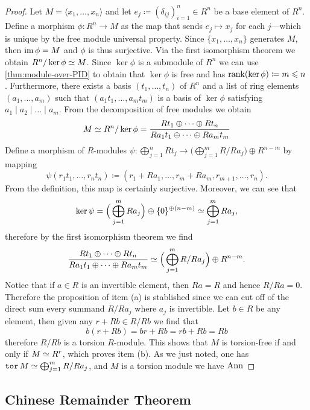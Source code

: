 \begin{proof}
Let \(M = \langle x_1, \dots, x_n \rangle\) and let
\(e_j \coloneq (\delta_{ij})_{i=1}^n \in R^n\) be a base element of \(R^n\). Define a morphism
\(\phi: R^n \to M\) as the map that sends \(e_j \mapsto x_j\) for each
\(j\)---which is unique by the free module universal property. Since
\(\{x_1, \dots, x_n\}\) generates \(M\), then \(\operatorname{im} \phi = M\) and \(\phi\) is thus
surjective. Via the first isomorphism theorem we obtain
\(R^n/\ker \phi \simeq M\). Since \(\ker \phi\) is a submodule of \(R^n\) we can use
\cref{thm:module-over-PID} to obtain that \(\ker \phi\) is free and has
\(\operatorname{rank}(\ker \phi) \coloneq m \leqslant n\). Furthermore, there exists a basis
\((t_1, \dots, t_n)\) of \(R^n\) and a list of ring elements
\((a_1, \dots, a_m)\) such that \((a_1 t_1, \dots, a_m t_m)\) is a basis of
\(\ker \phi\) satisfying \(a_1 \mid a_2 \mid \dots \mid a_m\). From the decomposition of
free modules we obtain
\[
M \simeq R^n/\ker \phi =
\frac{R t_1 \oplus \dots \oplus R t_n}{R a_1 t_1 \oplus \dots \oplus R a_m t_m}
\]
Define a morphism of \(R\)-modules
\(\psi: \bigoplus_{j=1}^n R t_j \to \big( \bigoplus_{j=1}^m R/Ra_j \big) \oplus R^{n-m}\)
by mapping
\[
\psi(r_1 t_1, \dots, r_n t_n) \coloneq
(r_1 + R a_1, \dots, r_m + R a_m, r_{m+1}, \dots, r_n).
\]
From the definition, this map is certainly surjective. Moreover, we can see that
\[
\ker \psi
= \Big( \bigoplus_{j=1}^m R a_j \Big) \oplus \{0\}^{\oplus (n-m)}
\simeq \bigoplus_{j=1}^m R a_j,
\]
therefore by the first isomorphism theorem we find
\[
\frac{R t_1 \oplus \dots \oplus R t_n}{R a_1 t_1 \oplus \dots \oplus R a_m t_m}
\simeq \Big( \bigoplus_{j=1}^m R/R a_j \Big) \oplus R^{n-m}.
\]
Notice that if \(a \in R\) is an invertible element, then \(R a = R\) and hence
\(R/Ra = 0\). Therefore the proposition of item (a) is stablished since we can
cut off of the direct sum every summand \(R/Ra_j\) where \(a_j\) is invertible.
Let \(b \in R\) be any element, then given any \(r + R b \in R/Rb\) we find that
\[
b(r + R b) = b r + R b = r b + R b = R b
\]
therefore \(R/Rb\) is a torsion \(R\)-module. This shows that \(M\) is
torsion-free if and only if \(M \simeq R^r\), which proves item (b). As we just
noted, one has \(\operatorname{\texttt{tor}} M \simeq \bigoplus_{j=1}^m R/R a_j\), and \(M\) is a
torsion module we have \(\operatorname{Ann}\)
\end{proof}

\subsection{Chinese Remainder Theorem}

